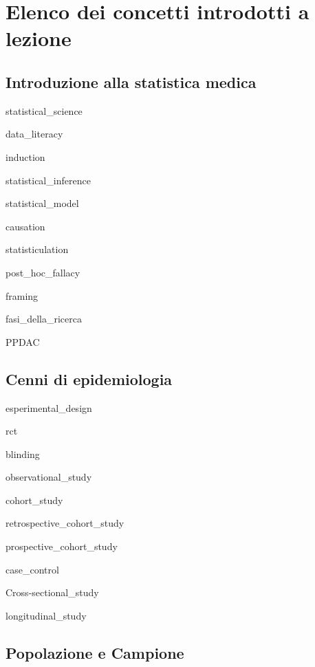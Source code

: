 \documentclass{report}
\begin{document}
\fancyhf{}
\fancyfoot[C]{}
\pagestyle{fancy}

\printnoidxglossary[sort=letter, title={Glossario}]

\newpage



\section*{Elenco dei concetti introdotti a lezione}


\subsection*{Introduzione alla statistica medica}

\gls{statistical_science}

\gls{data_literacy}

\gls{induction}

\gls{statistical_inference}

\gls{statistical_model}

\gls{causation}

\gls{statisticulation}

\gls{post_hoc_fallacy}

\gls{framing}

\gls{fasi_della_ricerca}

\gls{PPDAC}



\subsection*{Cenni di epidemiologia}

\gls{esperimental_design}

\gls{rct}

\gls{blinding}

\gls{observational_study}

\gls{cohort_study}

\gls{retrospective_cohort_study}

\gls{prospective_cohort_study}

\gls{case_control}

\gls{Cross-sectional_study}

\gls{longitudinal_study}




\subsection*{Popolazione e Campione}
\end{document}

